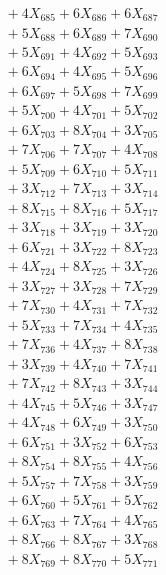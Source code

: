 \documentclass[a4paper,10pt]{article}
\begin{document}
{\begin{align}
&\;  + 4 X_{685} + 6 X_{686} + 6 X_{687} \\[0.3ex]
&\;  + 5 X_{688} + 6 X_{689} + 7 X_{690} \\[0.3ex]
&\;  + 5 X_{691} + 4 X_{692} + 5 X_{693} \\[0.3ex]
&\;  + 6 X_{694} + 4 X_{695} + 5 X_{696} \\[0.3ex]
&\;  + 6 X_{697} + 5 X_{698} + 7 X_{699} \\[0.5ex]\allowbreak
&\;  + 5 X_{700} + 4 X_{701} + 5 X_{702} \\[0.3ex]
&\;  + 6 X_{703} + 8 X_{704} + 3 X_{705} \\[0.3ex]
&\;  + 7 X_{706} + 7 X_{707} + 4 X_{708} \\[0.3ex]
&\;  + 5 X_{709} + 6 X_{710} + 5 X_{711} \\[0.3ex]
&\;  + 3 X_{712} + 7 X_{713} + 3 X_{714} \\[0.3ex]
&\;  + 8 X_{715} + 8 X_{716} + 5 X_{717} \\[0.3ex]
&\;  + 3 X_{718} + 3 X_{719} + 3 X_{720} \\[0.3ex]
&\;  + 6 X_{721} + 3 X_{722} + 8 X_{723} \\[0.3ex]
&\;  + 4 X_{724} + 8 X_{725} + 3 X_{726} \\[0.3ex]
&\;  + 3 X_{727} + 3 X_{728} + 7 X_{729} \\[0.5ex]\allowbreak
&\;  + 7 X_{730} + 4 X_{731} + 7 X_{732} \\[0.3ex]
&\;  + 5 X_{733} + 7 X_{734} + 4 X_{735} \\[0.3ex]
&\;  + 7 X_{736} + 4 X_{737} + 8 X_{738} \\[0.3ex]
&\;  + 3 X_{739} + 4 X_{740} + 7 X_{741} \\[0.3ex]
&\;  + 7 X_{742} + 8 X_{743} + 3 X_{744} \\[0.3ex]
&\;  + 4 X_{745} + 5 X_{746} + 3 X_{747} \\[0.3ex]
&\;  + 4 X_{748} + 6 X_{749} + 3 X_{750} \\[0.3ex]
&\;  + 6 X_{751} + 3 X_{752} + 6 X_{753} \\[0.3ex]
&\;  + 8 X_{754} + 8 X_{755} + 4 X_{756} \\[0.3ex]
&\;  + 5 X_{757} + 7 X_{758} + 3 X_{759} \\[0.5ex]\allowbreak
&\;  + 6 X_{760} + 5 X_{761} + 5 X_{762} \\[0.3ex]
&\;  + 6 X_{763} + 7 X_{764} + 4 X_{765} \\[0.3ex]
&\;  + 8 X_{766} + 8 X_{767} + 3 X_{768} \\[0.3ex]
&\;  + 8 X_{769} + 8 X_{770} + 5 X_{771} \\[0.3ex]

\end{align}}
\end{document}

